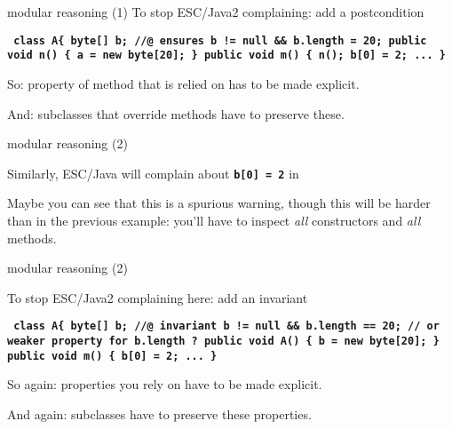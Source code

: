 \documentclass[
pdf,
nocolorBG,
slideColor,
erik,
]{prosper}
\newcommand{\code}[1]{{\rm \texttt{\textbf{\small #1}}}}
\begin{document}
\begin{slide}{modular reasoning (1)}
\vspace*{-3ex}
To stop ESC/Java2 complaining: add a postcondition
\begin{alltt}\code{ class A\{
  byte[] b;
 {\green //@ ensures b != null && b.length = 20;}
  public void n() \{ a = new byte[20]; \}
  public void m() \{ n();
                    b[0] = 2;
                    ...       \} 
}
\end{alltt}
So: property of method that is relied on has to be made explicit.

And: subclasses that override methods have to preserve these.

\end{slide}

\begin{slide}{modular reasoning (2)}
\vspace*{-3ex}

Similarly, ESC/Java will complain about \code{b[0] = 2} in

Maybe you can see that this is a spurious warning,
though this will be harder than in the previous example:
you'll have to inspect {\em all} constructors and {\em all} methods.

\end{slide}


\begin{slide}{modular reasoning (2)}
\vspace*{-3ex}

To stop ESC/Java2 complaining here: add an invariant

\begin{alltt}\code{ class A\{
  byte[] b;
  {\green //@ invariant b != null && b.length == 20;}
  {\green     // or weaker property for b.length ?}
  public void A() \{ b = new byte[20]; \}
  public void m() \{ b[0] = 2;
                    ...  \}
}
\end{alltt}

So again: properties you rely on have to be made explicit.

\medskip

And again: subclasses have to preserve these properties.

\end{slide}
\end{document}
